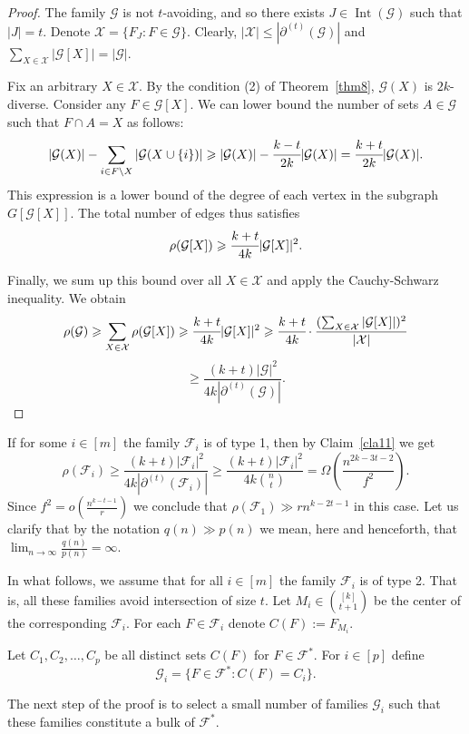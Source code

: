 \documentclass[12pt,a4paper]{article}
\newcommand{\ff}{\mathcal{F}}
\newcommand{\cG}{\mathcal{G}}
\begin{document}
\begin{proof}
The family $\cG$ is not $t$-avoiding, and so there exists $J \in \operatorname{Int}(\cG)$ such that $|J|=t.$ Denote
$\mathcal{X} = \{F_J : F \in \cG \}.$
Clearly, $|\mathcal{X}| \leqslant |\partial^{(t)}(\cG)|$ and $\sum_{X \in \mathcal{X}} |\cG[X]| = |\cG|$.

Fix an arbitrary $X \in \mathcal{X}$. By the condition (2) of Theorem~\ref{thm8}, $\cG(X)$ is $2k$-diverse. Consider any $F \in \cG[X]$.  We can lower bound the number of sets $A \in \cG$ such that $F \cap A = X$ as follows:
$$|\cG(X)| - \sum_{i \in F \setminus X} |\cG(X\cup\{i\})| \geqslant |\cG(X)| - \cfrac{k-t}{2k}|\cG(X)| = \cfrac{k+t}{2k}|\cG(X)|.$$
This expression is a lower bound of the degree of each vertex in the subgraph  $G[\cG[X]]$. The total number of edges thus satisfies 
$$\rho(\cG[X]) \geqslant  \cfrac{k+t}{4k}|\cG[X]|^2.$$

Finally, we sum up this bound over all $X \in \mathcal{X}$ and apply the Cauchy-Schwarz inequality. We obtain
$$\rho(\cG) \geqslant \sum_{X \in \mathcal{X}} \rho(\cG[X]) \geqslant \cfrac{k+t}{4k}|\cG[X]|^2 \geqslant \cfrac{k+t}{4k}\cdot \frac{(\sum_{X \in \mathcal{X}} |\cG[X]|)^2}{|\mathcal{X}|}$$
$$\geqslant \frac{(k+t)|\cG|^2}{4k|\partial^{(t)}(\cG)|}.$$

\end{proof}

If for some $i \in [m]$ the family $\ff_i$ is of type 1, then by Claim~\ref{cla11} we get
$$\rho(\mathcal{F}_i) \geqslant \frac{(k+t)|\ff_i|^2}{4k|\partial^{(t)}(\ff_i)|} \geqslant \frac{(k+t)|\ff_i|^2}{4k\binom{n}{t}} = \Omega \left(\frac{n^{2k-3t-2}}{f^2}\right).$$
Since $f^2=o(\frac{n^{k-t-1}}{r})$ we conclude that $\rho(\mathcal{F}_1) \gg rn^{k-2t-1}$ in this case. Let us clarify that by the notation $q(n) \gg p(n)$ we mean, here and henceforth, that $\lim _{n \rightarrow \infty} \frac{q(n)}{p(n)}=\infty.$


In what follows, we assume that for all $ i \in [m]$ the family $\mathcal{F}_{i}$ is of type 2. That is, all these families avoid intersection of size $t$. Let $M_i \in \binom{[k]}{t+1}$ be the center of the corresponding $\mathcal{F}_{i}$. For each $F \in \mathcal{F}_{i}$ denote $C(F) := F_{M_i}$.

Let $C_1, C_2, \ldots, C_p$ be all distinct sets $C(F)$ for $F \in \mathcal{F}^*$. For $i \in [p]$ define
$$\mathcal{G}_i = \{F \in \mathcal{F}^*: C(F) = C_i\}.$$

The next step of the proof is to select a small number of families $\mathcal{G}_i$ such that these families constitute a bulk of $\mathcal{F}^*$.
\end{document}
